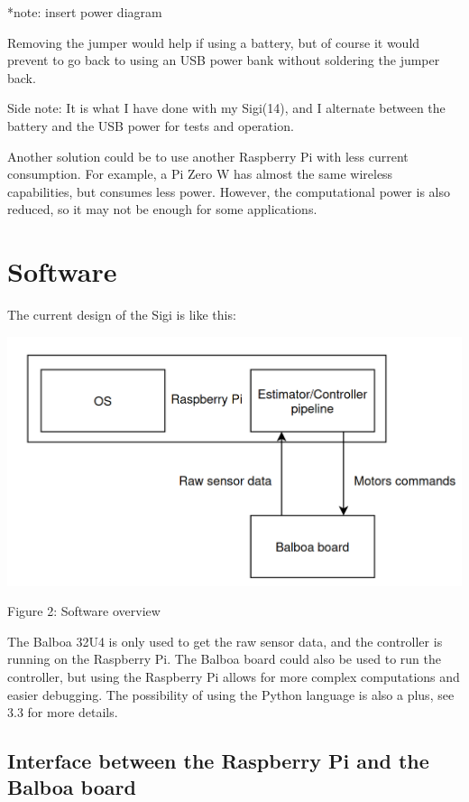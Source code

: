 \documentclass{article}
\begin{document}
*note: insert power diagram

Removing the jumper would help if using a battery, but of course it would prevent to go back to
using an USB power bank without soldering the jumper back.

Side note:
It is what I have done with my Sigi(14), and I alternate between the battery and the USB power
for tests and operation.

Another solution could be to use another Raspberry Pi with less current consumption. For example,
a Pi Zero W has almost the same wireless capabilities, but consumes less power. However,
the computational power is also reduced, so it may not be enough for some applications.

\section{Software}
The current design of the Sigi is like this:

\begin{center}

    \includegraphics[scale=0.2]{img/software.png}

    Figure 2: Software overview

\end{center}

The Balboa 32U4 is only used to get the raw sensor data, and the controller is running on the
Raspberry Pi. The Balboa board could also be used to run the controller, but using the Raspberry
Pi allows for more complex computations and easier debugging. The possibility of using the Python
language is also a plus, see 3.3 for more details.

\subsection{Interface between the Raspberry Pi and the Balboa board}
\end{document}

